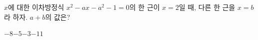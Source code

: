 $x$에 대한 이차방정식 $x^2-ax-a^2-1=0$의 한 근이 $x=2$일 때, 다른 한 근을 $x=b$라 하자. $a+b$의 값은? 
\begin{choices32}{$-8$}{$-5$}{$-3$}{$-1$}{$1$}\end{choices32}
